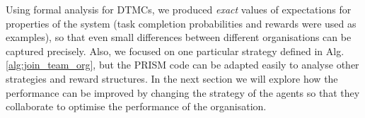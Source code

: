 \documentclass{llncs}
\begin{document}
\begin{table}[H]
 \centering
{}
\caption{Task completion probabilities for optimal agent organisations using Alg.~\ref{alg:join_team_org}'s offline and online versions (see Alg.~\ref{alg:main_process}).}
\label{tab:task_compl_dtmc}
\end{table}
\vspace{-30pt}

Using formal analysis for DTMCs, we produced \emph{exact} values of expectations for properties of the system (task completion probabilities and rewards were used as examples), so that even small differences between different organisations can be captured precisely. Also, we focused on one particular strategy defined in Alg. \ref{alg:join_team_org}, but the PRISM code can be adapted easily to analyse other strategies and reward structures. In the next section we will explore how the performance can be improved by changing the strategy of the agents so that they collaborate to optimise the performance of the organisation.
\vspace{-10pt}
\end{document}
